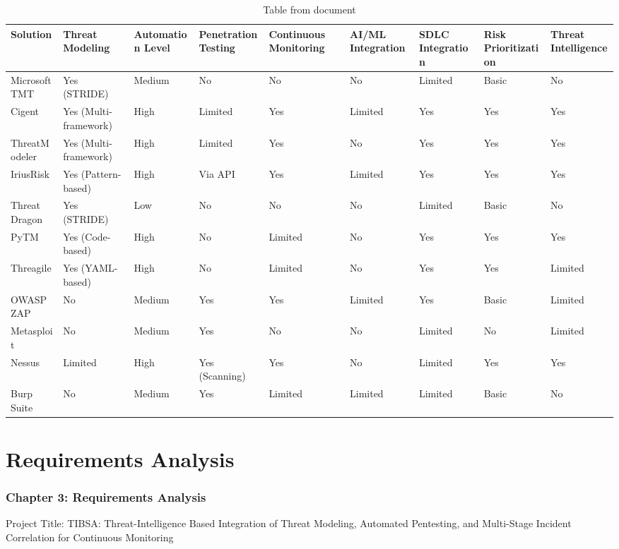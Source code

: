 \documentclass[12pt,a4paper]{report}
\begin{document}
\begin{table}[H]
\centering
\small
\begin{tabularx}{\textwidth}{|l|l|l|l|l|l|l|l|l|}
\hline
Solution & Threat Modeling & Automation Level & Penetration Testing & Continuous Monitoring & AI/ML Integration & SDLC Integration & Risk Prioritization & Threat Intelligence \\
\hline\hline
Microsoft TMT & Yes (STRIDE) & Medium & No & No & No & Limited & Basic & No \\
\hline
Cigent & Yes (Multi-framework) & High & Limited & Yes & Limited & Yes & Yes & Yes \\
\hline
ThreatModeler & Yes (Multi-framework) & High & Limited & Yes & No & Yes & Yes & Yes \\
\hline
IriusRisk & Yes (Pattern-based) & High & Via API & Yes & Limited & Yes & Yes & Yes \\
\hline
Threat Dragon & Yes (STRIDE) & Low & No & No & No & Limited & Basic & No \\
\hline
PyTM & Yes (Code-based) & High & No & Limited & No & Yes & Yes & Yes \\
\hline
Threagile & Yes (YAML-based) & High & No & Limited & No & Yes & Yes & Limited \\
\hline
OWASP ZAP & No & Medium & Yes & Yes & Limited & Yes & Basic & Limited \\
\hline
Metasploit & No & Medium & Yes & No & No & Limited & No & Limited \\
\hline
Nessus & Limited & High & Yes (Scanning) & Yes & No & Limited & Yes & Yes \\
\hline
Burp Suite & No & Medium & Yes & Limited & Limited & Limited & Basic & No \\
\hline
\end{tabularx}
\caption{Table from document}
\end{table}

\chapter{Requirements Analysis}
\label{ch:chapter3}

\subsection{Chapter 3: Requirements Analysis}

Project Title: TIBSA: Threat-Intelligence Based Integration of Threat Modeling, Automated Pentesting, and Multi-Stage Incident Correlation for Continuous Monitoring
\end{document}
